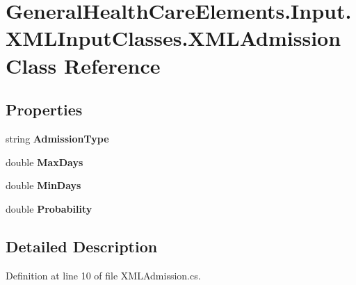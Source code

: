 \hypertarget{class_general_health_care_elements_1_1_input_1_1_x_m_l_input_classes_1_1_x_m_l_admission}{}\section{General\+Health\+Care\+Elements.\+Input.\+X\+M\+L\+Input\+Classes.\+X\+M\+L\+Admission Class Reference}
\label{class_general_health_care_elements_1_1_input_1_1_x_m_l_input_classes_1_1_x_m_l_admission}
\subsection*{Properties}
\begin{DoxyCompactItemize}
\item 
string {\bfseries Admission\+Type}\hypertarget{class_general_health_care_elements_1_1_input_1_1_x_m_l_input_classes_1_1_x_m_l_admission_a0ca3e40e70ec787965bd8abed998d978}{}\label{class_general_health_care_elements_1_1_input_1_1_x_m_l_input_classes_1_1_x_m_l_admission_a0ca3e40e70ec787965bd8abed998d978}

\item 
double {\bfseries Max\+Days}\hypertarget{class_general_health_care_elements_1_1_input_1_1_x_m_l_input_classes_1_1_x_m_l_admission_ab175dbfc2919876fec6fbece8d78ee21}{}\label{class_general_health_care_elements_1_1_input_1_1_x_m_l_input_classes_1_1_x_m_l_admission_ab175dbfc2919876fec6fbece8d78ee21}

\item 
double {\bfseries Min\+Days}\hypertarget{class_general_health_care_elements_1_1_input_1_1_x_m_l_input_classes_1_1_x_m_l_admission_ad2dc31993afad2663ea097524409dc53}{}\label{class_general_health_care_elements_1_1_input_1_1_x_m_l_input_classes_1_1_x_m_l_admission_ad2dc31993afad2663ea097524409dc53}

\item 
double {\bfseries Probability}\hypertarget{class_general_health_care_elements_1_1_input_1_1_x_m_l_input_classes_1_1_x_m_l_admission_a7ce9861a03ed981c1b67a866b968ed5c}{}\label{class_general_health_care_elements_1_1_input_1_1_x_m_l_input_classes_1_1_x_m_l_admission_a7ce9861a03ed981c1b67a866b968ed5c}

\end{DoxyCompactItemize}


\subsection{Detailed Description}


Definition at line 10 of file X\+M\+L\+Admission.\+cs.

